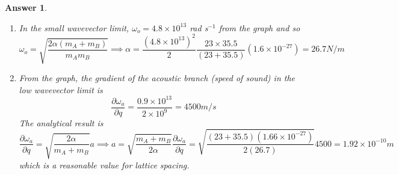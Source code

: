 \documentclass[a4paper]{article}
\newtheorem{ans}{Answer}[subsection]
\theoremstyle{new}
\begin{document}
\begin{ans}
\begin{enumerate}[label=(\roman*)]
$$\omega^2\approx\frac{\alpha(m_A+m_B)}{m_Am_B}\bigg[1\pm\bigg(1-\frac{2m_Am_Bq^2a^2}{(m_A+m_B)^2}+\dots\bigg)\bigg]=\left\{
        \begin{array}{l}
      \frac{2\alpha}{m_Am_B}(m_A+m_B)   \\
      \frac{2\alpha q^2a^2}{m_A+m_B}
        \end{array}
    \right.$$
\item In the small wavevector limit, $\omega_o=4.8\times10^{13}$ rad s$^{-1}$ from the graph and so 
$$\omega_o=\sqrt{\frac{2\alpha(m_A+m_B)}{m_Am_B}}\implies\alpha=\frac{(4.8\times10^{13})^2}{2}\frac{23\times 35.5}{(23+35.5)}(1.6\times10^{-27})=26.7 N/m$$
\item From the graph, the gradient of the acoustic branch (speed of sound) in the low wavevector limit is
$$\frac{\partial\omega_a}{\partial q}=\frac{0.9\times10^{13}}{2\times10^9}=4500 m/s$$
The analytical result is
$$\frac{\partial\omega_a}{\partial q}=\sqrt{\frac{2\alpha}{m_A+m_B}}a\implies a=\sqrt{\frac{m_A+m_B}{2\alpha}}\frac{\partial\omega_a}{\partial q}=\sqrt{\frac{(23+35.5)(1.66\times10^{-27})}{2(26.7)}}4500=1.92\times10^{-10}m$$
which is a reasonable value for lattice spacing.
\end{enumerate}
\end{ans}
\newpage
\end{document}
